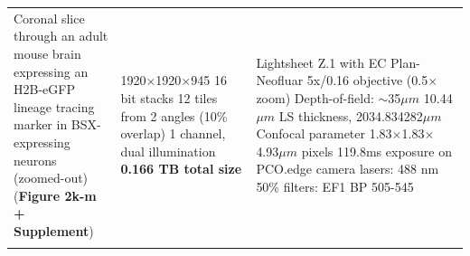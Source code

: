 \documentclass[]{spie}  %
\begin{document}
\begin{landscape}
{\begin{longtable}{lll}
\makecell[l]{Coronal slice through an adult \\mouse brain expressing an H2B-eGFP \\lineage tracing marker in BSX-expressing \\neurons  (zoomed-out) \\(\textbf{Figure 2k-m + Supplement})} &  \makecell[l]{1920$\times$1920$\times$945 16 bit stacks\\12 tiles from 2 angles (10\% overlap) \\1 channel, dual illumination\\\textbf{0.166 TB total size}}  &  \makecell[l]{Lightsheet Z.1 with EC Plan-Neofluar 5x/0.16 objective (0.5$\times$ zoom) \\ Depth-of-field: $\sim$35$\mu{}m$\\ 10.44$\mu{}m$ LS thickness, 2034.834282$\mu{}m$ Confocal parameter\\1.83$\times$1.83$\times$4.93$\mu{}m$ pixels\\119.8ms exposure on PCO.edge camera\\lasers: 488 nm 50\%\\filters: EF1 BP 505-545} \\ \\


\end{longtable}}
\end{landscape}
\end{document}
